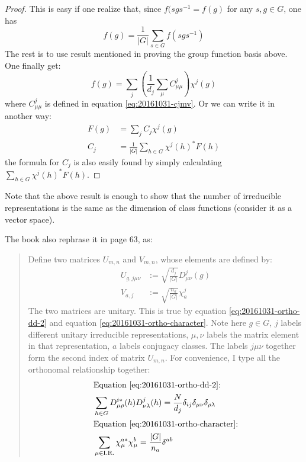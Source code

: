     \begin{proof}
        This is easy if one realize that, since $f(sgs^{-1}=f(g)$ for
        any $s,g\in G$, one has
        \begin{equation}
            f(g) = \frac{1}{|G|} \sum_{s\in G} f(s g s^{-1})
        \end{equation}
        The rest is to use result mentioned in proving the group
        function basis above. One finally get:
        \begin{equation}
            f(g) = \sum_j \left(\frac{1}{d_j}\sum_\mu
            C^j_{\mu\mu}\right) \chi^j(g)
        \end{equation}
        where $C^j_{\mu\mu}$ is defined in equation
        \ref{eq:20161031-cjmv}.
        Or we can write it in another way:
        \begin{align}
            F(g) &= \sum_j C_j \chi^j(g) \\
            C_j &= \frac{1}{|G|} \sum_{h\in G}\chi^j(h)^* F(h)
        \end{align}
        the formula for $C_j$ is also easily found by simply
        calculating $\sum_{h\in G}\chi^j(h)^* F(h)$.
    \end{proof}
    Note that the above result is enough to show that the number of
    irreducible representations is the same as the dimension of
    class functions (consider it as a vector space).

    The book \cite{book} also rephrase it in page 63, as:
    \begin{quote}
        Define two matrices $U_{m,n}$ and $V_{m,n}$, whose elements
        are defined by:
    \begin{align}
        U_{g,j\mu\nu} &:= \sqrt{\frac{d_j}{|G|}} D^j_{\mu\nu}(g) \\
        V_{a,j} &:= \sqrt{\frac{n_a}{|G|}} \chi^j_a
    \end{align}
    The two matrices are unitary. This is true by equation
    \ref{eq:20161031-ortho-dd-2} and equation
    \ref{eq:20161031-ortho-character}. Note here $g\in G$, $j$ labels
    different unitary irreducible representations, $\mu,\nu$ labels
    the matrix element in that representation, $a$ labels conjugacy
    classes. The labels $j\mu\nu$ together form the second index of
    matrix $U_{m,n}$. For convenience, I type all the orthonomal
    relationship together:
    \begin{align}
        &\text{Equation \ref{eq:20161031-ortho-dd-2}:} \nonumber \\
        & \sum_{h\in G} D^{i*}_{\mu\rho}(h)D^j_{\nu \lambda}(h) =
        \frac{N}{d_j} \delta_{ij} \delta_{\mu\nu}\delta_{\rho\lambda}
        \\
        &\text{Equation \ref{eq:20161031-ortho-character}:} \nonumber \\
        & \sum_{\mu \in \text{I.R.}} \chi^{a*}_\mu\chi^b_\mu = 
            \frac{|G|}{n_a} \delta^{ab} 
    \end{align}
    \end{quote}
